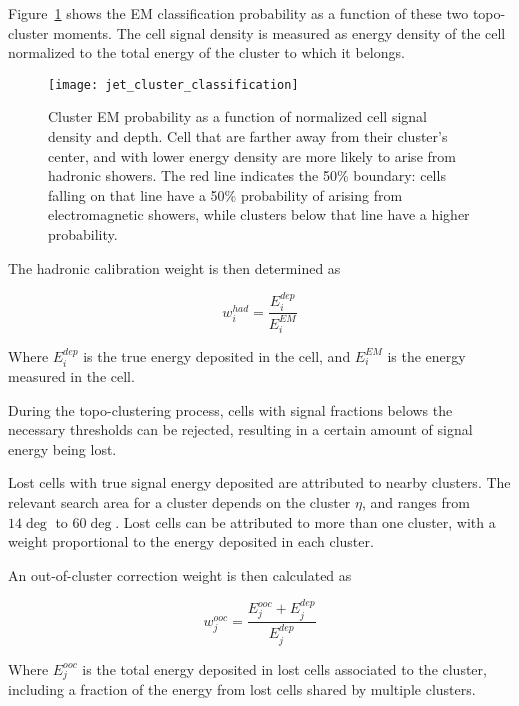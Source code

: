 Figure~\ref{fig:jet_cluster_classification} shows the EM classification probability as a function of these two
topo-cluster moments.
The cell signal density is measured as energy density of the cell normalized to the total energy
of the cluster to which it belongs.

\begin{figure}[!ht]
    \centering
\texttt{[image: jet\_cluster\_classification]}
\caption{Cluster EM probability as a function of normalized cell signal density and depth.
Cell that are farther away from their cluster's center, and with lower energy density are more likely to arise
from hadronic showers.
The red line indicates the 50\% boundary: cells falling on that line have a 50\% probability of arising from
electromagnetic showers, while clusters below that line have a higher probability.}
\label{fig:jet_cluster_classification}
\end{figure}\cite{jet-topo-cluster}

The hadronic calibration weight is then determined as

\begin{equation}\label{eq:had_cal_weight}
    w_{i}^{had} = \frac{E^{dep}_i}{E^{EM}_i}
\end{equation}

Where $E^{dep}_i$ is the true energy deposited in the cell, and $E^{EM}_i$ is the energy measured in the cell.

During the topo-clustering process, cells with signal fractions belows the necessary thresholds can be rejected,
resulting in a certain amount of signal energy being lost.

Lost cells with true signal energy deposited are attributed to nearby clusters.
The relevant search area for a cluster depends on the cluster $\eta$, and ranges from $14\deg$ to $60\deg$.\cite{jet-topo-cluster}
Lost cells can be attributed to more than one cluster, with a weight proportional to the energy deposited in each cluster.

An out-of-cluster correction weight is then calculated as

\begin{equation}\label{eq:out_of_cluster}
    w_{j}^{ooc} = \frac{E_j^{ooc}+E^{dep}_j}{E^{dep}_j}
\end{equation}

Where $E_j^{ooc}$ is the total energy deposited in lost cells associated to the cluster, including a fraction
of the energy from lost cells shared by multiple clusters.

